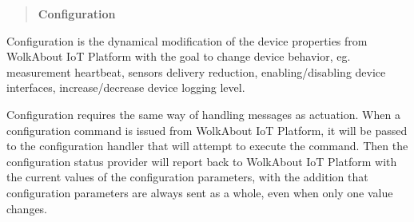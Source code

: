 \label{_configuration}%
 \begin{quote}
{\bfseries Configuration} \end{quote}


Configuration is the dynamical modification of the device properties from Wolk\+About IoT Platform with the goal to change device behavior, eg. measurement heartbeat, sensors delivery reduction, enabling/disabling device interfaces, increase/decrease device logging level.

Configuration requires the same way of handling messages as actuation. When a configuration command is issued from Wolk\+About IoT Platform, it will be passed to the configuration handler that will attempt to execute the command. Then the configuration status provider will report back to Wolk\+About IoT Platform with the current values of the configuration parameters, with the addition that configuration parameters are always sent as a whole, even when only one value changes. 

 